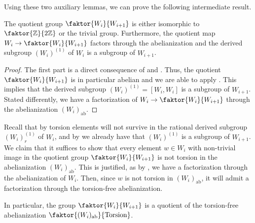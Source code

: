 Using these two auxiliary lemmas, we can prove the following intermediate result.

\begin{proposition}\label{prop:factorization}
    The quotient group \(\faktor{W_{i}}{W_{i+1}}\) is either isomorphic to \(\faktor{\Z}{2\Z}\) or the trivial group.
    Furthermore, the quotient map \(W_i \to \faktor{W_i}{W_{i+1}}\) factors through the abelianization and the derived subgroup \((W_i)^{(1)}\) of \(W_i\) is a subgroup of \(W_{i+1}\).
\end{proposition}
\begin{proof}
    The first part is a direct consequence of  and .
    Thus, the quotient \(\faktor{W_i}{W_{i+1}}\) is in particular abelian and we are able to apply .
    This implies that the derived subgroup \((W_i)^{(1)} = [W_i, W_i]\) is a subgroup of \(W_{i+1}\).
    Stated differently, we have a factorization of \(W_i \to \faktor{W_i}{W_{i+1}}\) through the abelianization \((W_i)_{\text{ab}}\).
\end{proof}
\newpage

\begin{remark}
    Recall that by  torsion elements will not survive in the rational derived subgroup \((W_i)_r^{(1)}\) of \(W_i\), and by  we already have that \((W_i)^{(1)}\) is a subgroup of \(W_{i+1}\).
    We claim that it suffices to show that every element \(w \in W_i\) with non-trivial image in the quotient group \(\faktor{W_i}{W_{i+1}}\) is not torsion in the abelianization \((W_i)_{\text{ab}}\).
    This is justified, as by , we have a factorization through the abelianization of \(W_i\).
    Then, since \(w\) is not torsion in \((W_i)_{\text{ab}}\), it will admit a factorization through the torsion-free abelianization.
    \begin{figure}[h!]
        \centering
    \end{figure}\vspace*{-1\parskip}
    
    \noindent
    In particular, the group \(\faktor{W_i}{W_{i+1}}\) is a quotient of the torsion-free abelianization \(\faktor{(W_i)_{\text{ab}}}{\text{Torsion}}\).
\end{remark}

